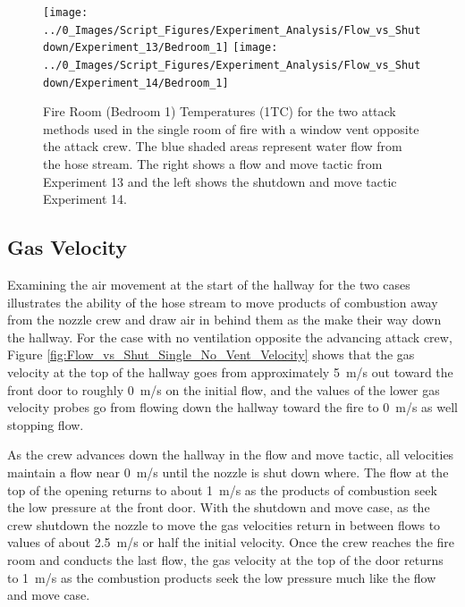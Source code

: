 \documentclass[12pt,oneside]{book}
\begin{document}
\begin{figure}[H]
\centering
\texttt{[image: ../0\_Images/Script\_Figures/Experiment\_Analysis/Flow\_vs\_Shutdown/Experiment\_13/Bedroom\_1]}
\texttt{[image: ../0\_Images/Script\_Figures/Experiment\_Analysis/Flow\_vs\_Shutdown/Experiment\_14/Bedroom\_1]}
\caption[Two Room - Two Vents Opposite - Flow \& Move vs. Shutdown \& Move - Bedroom 1 Temperature]{Fire Room (Bedroom 1) Temperatures (1TC) for the two attack methods used in the single room of fire with a window vent opposite the attack crew. The blue shaded areas represent water flow from the hose stream. The right shows a flow and move tactic from Experiment 13 and the left shows the shutdown and move tactic Experiment 14.}
\label{fig:Flow_vs_Shut_Two_Vent_Fire_Temp}
\end{figure}


\subsection{Gas Velocity}
Examining the air movement at the start of the hallway for the two cases illustrates the ability of the hose stream to move products of combustion away from the nozzle crew and draw air in behind them as the make their way down the hallway. For the case with no ventilation opposite the advancing attack crew, Figure \ref{fig:Flow_vs_Shut_Single_No_Vent_Velocity} shows that the gas velocity at the top of the hallway goes from approximately 5~m/s out toward the front door to roughly 0~m/s on the initial flow, and the values of the lower gas velocity probes go from flowing down the hallway toward the fire to 0~m/s as well stopping flow. 

As the crew advances down the hallway in the flow and move tactic, all velocities maintain a flow near 0~m/s until the nozzle is shut down where. The flow at the top of the opening returns to about 1~m/s as the products of combustion seek the low pressure at the front door.  With the shutdown and move case, as the crew shutdown the nozzle to move the gas velocities return in between flows to values of about 2.5~m/s or half the initial velocity. Once the crew reaches the fire room and conducts the last flow, the gas velocity at the top of the door returns to 1~m/s as the combustion products seek the low pressure much like the flow and move case.
\end{document}
